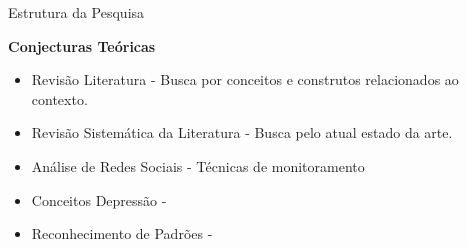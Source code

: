 \documentclass[aspectratio=169,10pt,xcolor={dvipsnames}]{beamer}
\begin{document}
\begin{frame}{Estrutura da Pesquisa}{}
  
  \textbf{\large Conjecturas Teóricas}
  
  \begin{block}{}
    \begin{itemize}
      \item Revisão Literatura - Busca por conceitos e construtos relacionados ao contexto.
      \item Revisão Sistemática da Literatura - Busca pelo atual estado da arte.
    \end{itemize}
  \end{block}
  \begin{block}{}
    \begin{itemize}
      \item[\textbullet] Análise de Redes Sociais - Técnicas de monitoramento
      \item[\textbullet] Conceitos Depressão - \cite{american2013diagnostic}
      \item[\textbullet] Reconhecimento de Padrões - \cite{Nolasco2016}
    \end{itemize}
  \end{block}
   

  
    
\end{frame}
\end{document}
